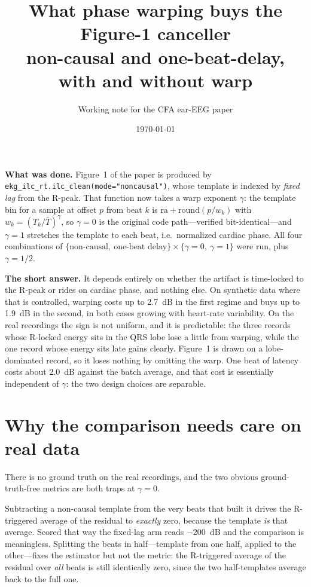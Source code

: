 \documentclass[11pt]{article}
\title{\vspace{-2em}\bfseries What phase warping buys the Figure-1 canceller\\
\large non-causal and one-beat-delay, with and without warp}
\author{Working note for the CFA ear-EEG paper}
\date{\today}
\begin{document}
\maketitle
\vspace{-1.5em}

\noindent
\textbf{What was done.} Figure~1 of the paper is produced by
\texttt{ekg\_ilc\_rt.ilc\_clean(mode="noncausal")}, whose template is indexed by
\emph{fixed lag} from the R-peak. That function now takes a warp exponent $\gamma$: the
template bin for a sample at offset $p$ from beat $k$ is
$\mathrm{ra} + \mathrm{round}(p/w_k)$ with $w_k = (T_k/\bar T)^{\gamma}$, so $\gamma=0$ is the
original code path---verified bit-identical---and $\gamma=1$ stretches the template to each beat,
i.e.\ normalized cardiac phase. All four combinations of
$\{\text{non-causal},\ \text{one-beat delay}\}\times\{\gamma=0,\ \gamma=1\}$ were run, plus
$\gamma=1/2$.

\textbf{The short answer.} It depends entirely on whether the artifact is time-locked to the
R-peak or rides on cardiac phase, and nothing else. On synthetic data where that is controlled,
warping costs up to 2.7~dB in the first regime and buys up to 1.9~dB in the second,
in both cases growing with heart-rate variability. On the real recordings the sign is not uniform,
and it is predictable: the three records whose R-locked energy sits in the QRS lobe lose a little
from warping, while the one record whose energy sits late gains clearly. Figure~1 is drawn on a
lobe-dominated record, so it loses nothing by omitting the warp. One beat of latency costs about
2.0~dB against the batch average, and that cost is essentially independent of $\gamma$: the
two design choices are separable.

\section{Why the comparison needs care on real data}

There is no ground truth on the real recordings, and the two obvious ground-truth-free metrics are
both traps at $\gamma=0$.

Subtracting a non-causal template from the very beats that built it drives the R-triggered average
of the residual to \emph{exactly} zero, because the template \emph{is} that average. Scored that
way the fixed-lag arm reads $-200$~dB and the comparison is meaningless. Splitting the beats in
half---template from one half, applied to the other---fixes the estimator but not the metric: the
R-triggered average of the residual over \emph{all} beats is still identically zero, since the two
half-templates average back to the full one.
\end{document}
